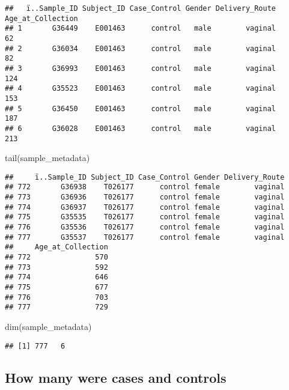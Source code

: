 \documentclass[
]{article}
\newenvironment{Shaded}{\begin{snugshade}}{\end{snugshade}}
\newcommand{\FunctionTok}[1]{\textcolor[rgb]{0.00,0.00,0.00}{#1}}
\newcommand{\NormalTok}[1]{#1}
\begin{document}
\begin{verbatim}
##   ï..Sample_ID Subject_ID Case_Control Gender Delivery_Route Age_at_Collection
## 1       G36449    E001463      control   male        vaginal                62
## 2       G36034    E001463      control   male        vaginal                82
## 3       G36993    E001463      control   male        vaginal               124
## 4       G35523    E001463      control   male        vaginal               153
## 5       G36450    E001463      control   male        vaginal               187
## 6       G36028    E001463      control   male        vaginal               213
\end{verbatim}

\begin{Shaded}
\begin{Highlighting}[]
\FunctionTok{tail}\NormalTok{(sample\_metadata)}
\end{Highlighting}
\end{Shaded}

\begin{verbatim}
##     ï..Sample_ID Subject_ID Case_Control Gender Delivery_Route
## 772       G36938    T026177      control female        vaginal
## 773       G36936    T026177      control female        vaginal
## 774       G36937    T026177      control female        vaginal
## 775       G35535    T026177      control female        vaginal
## 776       G35536    T026177      control female        vaginal
## 777       G35537    T026177      control female        vaginal
##     Age_at_Collection
## 772               570
## 773               592
## 774               646
## 775               677
## 776               703
## 777               729
\end{verbatim}

\begin{Shaded}
\begin{Highlighting}[]
\FunctionTok{dim}\NormalTok{(sample\_metadata)}
\end{Highlighting}
\end{Shaded}

\begin{verbatim}
## [1] 777   6
\end{verbatim}

\hypertarget{how-many-were-cases-and-controls}{%
\subsection{How many were cases and
controls}\label{how-many-were-cases-and-controls}}
\end{document}
